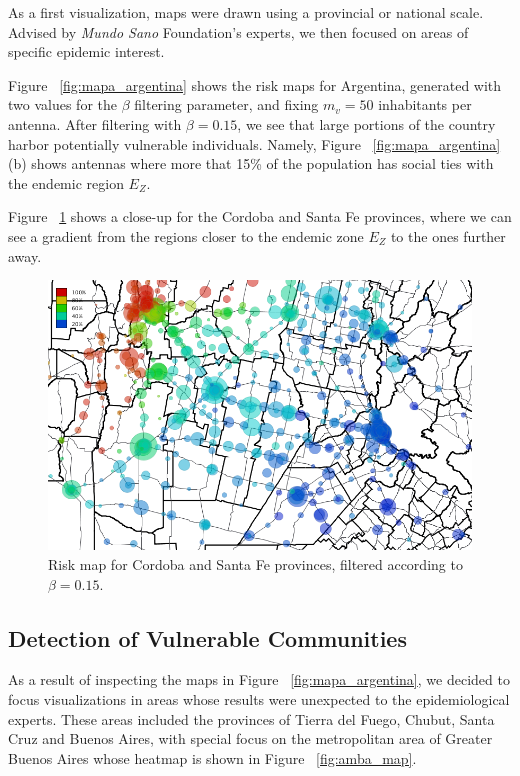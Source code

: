 As a first visualization, maps were drawn using a provincial or national scale.
Advised by \textit{Mundo Sano} Foundation's experts, we then focused on areas of specific epidemic interest. 

Figure~ \cref{fig:mapa_argentina} shows the risk maps for Argentina, generated with
two values for the $\beta$ filtering parameter, and fixing $m_v = 50$ inhabitants per antenna. After filtering with $\beta = 0.15$, we see that large portions of the country harbor potentially vulnerable individuals.
Namely, Figure~ \cref{fig:mapa_argentina}(b) shows antennas where more that 15\% of the population has social ties with the endemic region $E_Z$.

Figure~ \cref{fig:cba_sfe} shows a close-up for the Cordoba and Santa Fe provinces,
where we can see a gradient from the regions closer to the endemic zone $E_Z$ to the ones further away.


\begin{figure}[p]
	\centering
	\includegraphics[width=0.95\linewidth]
	{figures/201112_hi_res_cba_sfe_usuarios_proporcion_circulos_beta15/201112_hi_res_cba_sfe_usuarios_proporcion_circulos_beta15}
	\caption{Risk map for Cordoba and Santa Fe provinces, filtered according to $\beta = 0.15$.}
	\label{fig:cba_sfe}
\end{figure}



\subsection{Detection of Vulnerable Communities}

As a result of inspecting the maps in Figure~ \cref{fig:mapa_argentina}, we decided to 
focus visualizations in areas whose results were unexpected to the epidemiological experts. 
These areas included the provinces of Tierra del Fuego, Chubut, Santa Cruz and Buenos Aires, with special focus on the metropolitan area of Greater Buenos Aires whose heatmap is shown in Figure~ \cref{fig:amba_map}.

